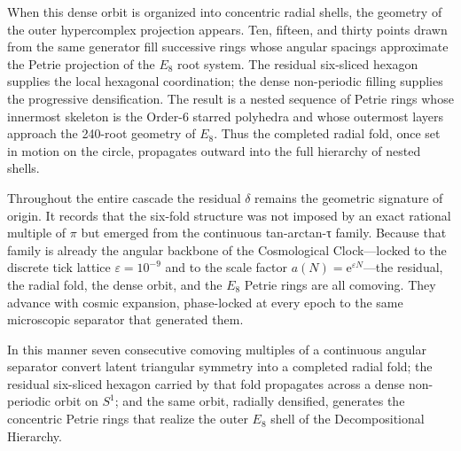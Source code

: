 When this dense orbit is organized into concentric radial shells, the geometry of the outer hypercomplex projection appears. Ten, fifteen, and thirty points drawn from the same generator fill successive rings whose angular spacings approximate the Petrie projection of the \(E_8\) root system. The residual six-sliced hexagon supplies the local hexagonal coordination; the dense non-periodic filling supplies the progressive densification. The result is a nested sequence of Petrie rings whose innermost skeleton is the Order-6 starred polyhedra and whose outermost layers approach the 240-root geometry of \(E_8\). Thus the completed radial fold, once set in motion on the circle, propagates outward into the full hierarchy of nested shells.

Throughout the entire cascade the residual \(\delta\) remains the geometric signature of origin. It records that the six-fold structure was not imposed by an exact rational multiple of \(\pi\) but emerged from the continuous tan-arctan-τ family. Because that family is already the angular backbone of the Cosmological Clock—locked to the discrete tick lattice \(\varepsilon=10^{-9}\) and to the scale factor \(a(N)=\mathrm{e}^{\varepsilon N}\)—the residual, the radial fold, the dense orbit, and the \(E_8\) Petrie rings are all comoving. They advance with cosmic expansion, phase-locked at every epoch to the same microscopic separator that generated them.

In this manner seven consecutive comoving multiples of a continuous angular separator convert latent triangular symmetry into a completed radial fold; the residual six-sliced hexagon carried by that fold propagates across a dense non-periodic orbit on \(S^1\); and the same orbit, radially densified, generates the concentric Petrie rings that realize the outer \(E_8\) shell of the Decompositional Hierarchy.
